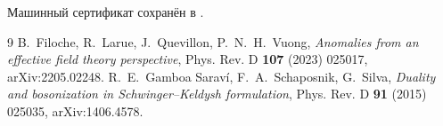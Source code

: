 Машинный сертификат сохранён в
.

\begin{thebibliography}{9}
B.~Filoche, R.~Larue, J.~Quevillon, P.~N.~H.~Vuong,
\emph{Anomalies from an effective field theory perspective},
Phys. Rev. D \textbf{107} (2023) 025017, arXiv:2205.02248.
R.~E.~Gamboa Sarav\'i, F.~A.~Schaposnik, G.~Silva,
\emph{Duality and bosonization in Schwinger--Keldysh formulation},
Phys. Rev. D \textbf{91} (2015) 025035, arXiv:1406.4578.
\end{thebibliography}
